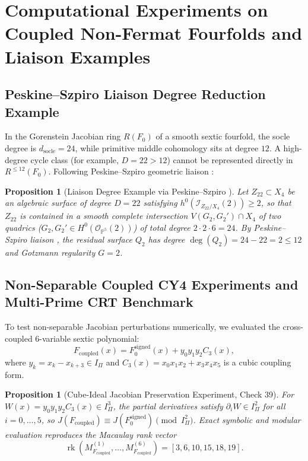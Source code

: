 \documentclass[11pt,a4paper]{article}
\newtheorem{proposition}[theorem]{Proposition}
\theoremstyle{definition}
\theoremstyle{remark}
\DeclareMathOperator{\rk}{rk}
\begin{document}
\section{Computational Experiments on Coupled Non-Fermat Fourfolds and Liaison Examples}
\label{sec:clay_attack}

\subsection{Peskine--Szpiro Liaison Degree Reduction Example}
In the Gorenstein Jacobian ring $R(F_0)$ of a smooth sextic fourfold, the socle degree is $d_{\mathrm{socle}} = 24$, while primitive middle cohomology sits at degree $12$. A high-degree cycle class (for example, $D = 22 > 12$) cannot be represented directly in $R^{\le 12}(F_0)$. Following Peskine--Szpiro geometric liaison \cite{PeskineSzpiro1974}:

\begin{proposition}[Liaison Degree Example via Peskine--Szpiro \cite{PeskineSzpiro1974}]
Let $Z_{22} \subset X_4$ be an algebraic surface of degree $D = 22$ satisfying $h^0(\mathcal{I}_{Z_{22}/X_4}(2)) \ge 2$, so that $Z_{22}$ is contained in a smooth complete intersection $V(G_2, G_2') \cap X_4$ of two quadrics ($G_2, G_2' \in H^0(\mathcal{O}_{\mathbb{P}^5}(2))$) of total degree $2 \cdot 2 \cdot 6 = 24$. By Peskine--Szpiro liaison \cite{PeskineSzpiro1974}, the residual surface $Q_2$ has degree $\deg(Q_2) = 24 - 22 = 2 \le 12$ and Gotzmann regularity $G = 2$.
\end{proposition}

\subsection{Non-Separable Coupled CY4 Experiments and Multi-Prime CRT Benchmark}
To test non-separable Jacobian perturbations numerically, we evaluated the cross-coupled 6-variable sextic polynomial:
\begin{equation}
F_{\mathrm{coupled}}(x) = F_0^{\mathrm{signed}}(x) + y_0 y_1 y_2 C_3(x),
\end{equation}
where $y_k = x_k - x_{k+3} \in I_\Pi$ and $C_3(x) = x_0 x_1 x_2 + x_3 x_4 x_5$ is a cubic coupling form.

\begin{proposition}[Cube-Ideal Jacobian Preservation Experiment, Check 39]
For $W(x) = y_0 y_1 y_2 C_3(x) \in I_\Pi^3$, the partial derivatives satisfy $\partial_i W \in I_\Pi^2$ for all $i = 0,\dots,5$, so $J(F_{\mathrm{coupled}}) \equiv J(F_0^{\mathrm{signed}}) \pmod{I_\Pi^2}$. Exact symbolic and modular evaluation reproduces the Macaulay rank vector
\begin{equation}
\rk \left( M_{F_{\mathrm{coupled}}}^{(1)}, \dots, M_{F_{\mathrm{coupled}}}^{(6)} \right) = [3, 6, 10, 15, 18, 19].
\end{equation}
\end{proposition}
\end{document}
